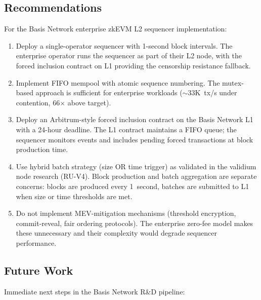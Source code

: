 \subsection{Recommendations}

For the Basis Network enterprise zkEVM L2 sequencer implementation:

\begin{enumerate}
  \item Deploy a single-operator sequencer with 1-second block intervals. The
    enterprise operator runs the sequencer as part of their L2 node, with the
    forced inclusion contract on L1 providing the censorship resistance fallback.

  \item Implement FIFO mempool with atomic sequence numbering. The mutex-based
    approach is sufficient for enterprise workloads (${\sim}$33K~tx/s under
    contention, 66$\times$ above target).

  \item Deploy an Arbitrum-style forced inclusion contract on the Basis Network L1
    with a 24-hour deadline. The L1 contract maintains a FIFO queue; the sequencer
    monitors events and includes pending forced transactions at block production time.

  \item Use hybrid batch strategy (size OR time trigger) as validated in the
    validium node research (RU-V4). Block production and batch aggregation are
    separate concerns: blocks are produced every 1~second, batches are submitted
    to L1 when size or time thresholds are met.

  \item Do not implement MEV-mitigation mechanisms (threshold encryption,
    commit-reveal, fair ordering protocols). The enterprise zero-fee model makes
    these unnecessary and their complexity would degrade sequencer performance.
\end{enumerate}

\subsection{Future Work}

Immediate next steps in the Basis Network R\&D pipeline:

